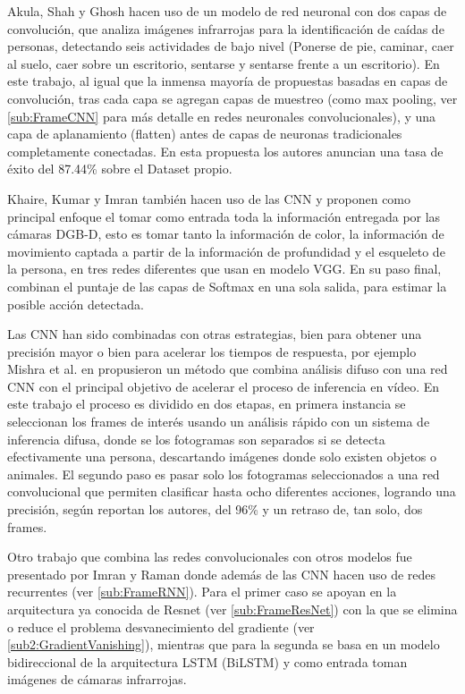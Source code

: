         Akula, Shah y Ghosh \cite{Akula2018HarCnn} hacen uso de un modelo de red neuronal con dos capas de convolución, que analiza imágenes infrarrojas para la identificación de caídas de personas, detectando seis actividades de bajo nivel (Ponerse de pie, caminar, caer al suelo, caer sobre un escritorio, sentarse y sentarse frente a un escritorio). En este trabajo, al igual que la inmensa mayoría de propuestas basadas en capas de convolución, tras cada capa se agregan capas de muestreo (como max pooling, ver \ref{sub:FrameCNN} para más detalle en redes neuronales convolucionales), y una capa de aplanamiento (flatten) antes de capas de neuronas tradicionales completamente conectadas. En esta propuesta los autores anuncian una tasa de éxito del 87.44\% sobre el Dataset propio.
        
        Khaire, Kumar y Imran \cite{Khaire2018HarCnn} también hacen uso de las CNN y proponen como principal enfoque el tomar como entrada toda la información entregada por las cámaras DGB-D, esto es tomar tanto la información de color, la información de movimiento captada a partir de la información de profundidad y el esqueleto de la persona, en tres redes diferentes que usan en modelo VGG\cite{Simonyan2014VGG}. En su paso final, combinan el puntaje de las capas de Softmax en una sola salida, para estimar la posible acción detectada.
        
        Las CNN han sido combinadas con otras estrategias, bien para obtener una precisión mayor o bien para acelerar los tiempos de respuesta, por ejemplo Mishra et al. en \cite{Mishra2020HarCnnFuzzy} propusieron un método que combina análisis difuso con una red CNN con el principal objetivo de acelerar el proceso de inferencia en vídeo. En este trabajo el proceso es dividido en dos etapas, en primera instancia se seleccionan los frames de interés usando un análisis rápido con un sistema de inferencia difusa, donde se los fotogramas son separados si se detecta efectivamente una persona, descartando imágenes donde solo existen objetos o animales. El segundo paso es pasar solo los fotogramas seleccionados a una red convolucional que permiten clasificar hasta ocho diferentes acciones, logrando una precisión, según reportan los autores, del 96\% y un retraso de, tan solo, dos frames. 
        
        Otro trabajo que combina las redes convolucionales con otros modelos fue presentado por Imran y Raman \cite{Imran2019HarCnnLstm} donde además de las CNN hacen uso de redes recurrentes (ver \ref{sub:FrameRNN}). Para el primer caso se apoyan en la arquitectura ya conocida de Resnet (ver \ref{sub:FrameResNet}) con la que se elimina o reduce el problema desvanecimiento del gradiente (ver \ref{sub2:GradientVanishing}), mientras que para la segunda se basa en un modelo bidireccional de la arquitectura LSTM (BiLSTM) y como entrada toman imágenes de cámaras infrarrojas.
        
